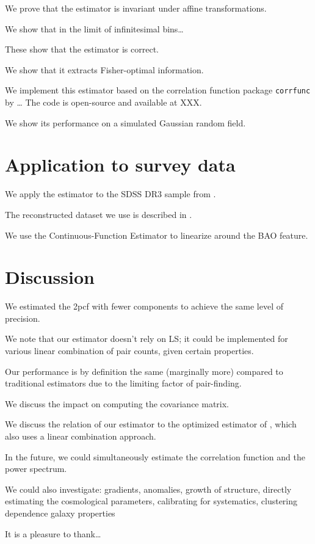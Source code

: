 \documentclass[twocolumn]{aastex62}
\newcommand{\cf}{2pcf\xspace} %
\newcommand{\est}{the Continuous-Function Estimator\xspace}
\begin{document}
We prove that the estimator is invariant under affine transformations.

We show that in the limit of infinitesimal bins\ldots

These show that the estimator is correct.

We show that it extracts Fisher-optimal information.

We implement this estimator based on the correlation function package \texttt{corrfunc} by \citep{citeXXX} \ldots
The code is open-source and available at XXX.

We show its performance on a simulated Gaussian random field.

\section{Application to survey data} \label{sec:app}

We apply the estimator to the SDSS DR3 sample from \cite{Eisenstein2005}.

The reconstructed dataset we use is described in \cite{Kazin2010}.

We use \est to linearize around the BAO feature. 

\section{Discussion} \label{sec:discuss}

We estimated the \cf with fewer components to achieve the same level of precision.

We note that our estimator doesn't rely on LS; it could be implemented for various linear combination of pair counts, given certain properties. %

Our performance is by definition the same (marginally more) compared to traditional estimators due to the limiting factor of pair-finding.

We discuss the impact on computing the covariance matrix.

We discuss the relation of our estimator to the optimized estimator of \cite{VargasMagana2013}, which also uses a linear combination approach.

In the future, we could simultaneously estimate the correlation function and the power spectrum.

We could also investigate: gradients, anomalies, growth of structure, directly estimating the cosmological parameters, calibrating for systematics, clustering dependence galaxy properties


\acknowledgements
It is a pleasure to thank\ldots

% 

\end{document}
